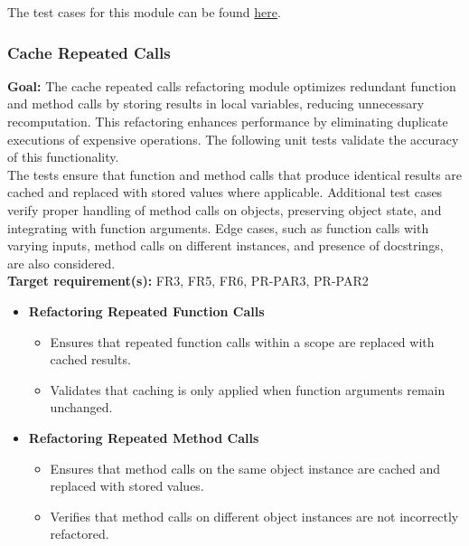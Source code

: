 \documentclass[12pt, titlepage]{article}
\begin{document}
\begin{enumerate}[label={\bf \textcolor{Maroon}{test-SRT-\arabic*}}, wide=0pt, font=\itshape]
\noindent The test cases for this module can be found \href{https://github.com/ssm-lab/capstone--source-code-optimizer/blob/new-poc/tests/refactorers/test_list_comp_any_all_refactor.py}{here}.

\subsubsection{Cache Repeated Calls}

\textbf{Goal:} The cache repeated calls refactoring module optimizes redundant function and method calls by storing results in local variables, reducing unnecessary recomputation. This refactoring enhances performance by eliminating duplicate executions of expensive operations. The following unit tests validate the accuracy of this functionality.\\

\noindent The tests ensure that function and method calls that produce identical results are cached and replaced with stored values where applicable. Additional test cases verify proper handling of method calls on objects, preserving object state, and integrating with function arguments. Edge cases, such as function calls with varying inputs, method calls on different instances, and presence of docstrings, are also considered.\\

\noindent \textbf{Target requirement(s):} FR3, FR5, FR6, PR-PAR3, PR-PAR2~\cite{SRS} \\

\begin{itemize}
    \item \textbf{Refactoring Repeated Function Calls}
    \begin{itemize}
        \item Ensures that repeated function calls within a scope are replaced with cached results.
        \item Validates that caching is only applied when function arguments remain unchanged.
    \end{itemize}

    \item \textbf{Refactoring Repeated Method Calls}
    \begin{itemize}
        \item Ensures that method calls on the same object instance are cached and replaced with stored values.
        \item Verifies that method calls on different object instances are not incorrectly refactored.
    \end{itemize}


\end{itemize}
\end{enumerate}
\end{document}
